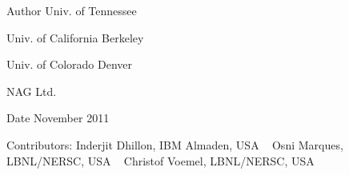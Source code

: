 \begin{DoxyAuthor}{Author}
Univ. of Tennessee 

Univ. of California Berkeley 

Univ. of Colorado Denver 

N\+A\+G Ltd. 
\end{DoxyAuthor}
\begin{DoxyDate}{Date}
November 2011 
\end{DoxyDate}
\begin{DoxyParagraph}{Contributors\+: }
Inderjit Dhillon, I\+B\+M Almaden, U\+S\+A ~\newline
 Osni Marques, L\+B\+N\+L/\+N\+E\+R\+S\+C, U\+S\+A ~\newline
 Christof Voemel, L\+B\+N\+L/\+N\+E\+R\+S\+C, U\+S\+A ~\newline
 
\end{DoxyParagraph}
